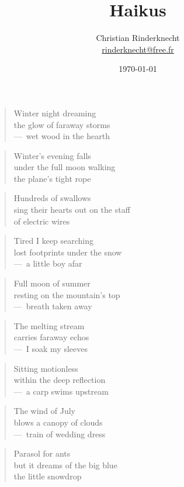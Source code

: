 \documentclass[a4paper,12pt]{article}
\title{Haikus}
\author{Christian Rinderknecht\\
{\small \url{rinderknecht@free.fr}}}
\date{\today}
\begin{document}
\begin{verse}
  Winter night dreaming \\
  the glow of faraway storms \\
  ---~wet wood in the hearth
\end{verse}

\begin{verse}
  Winter's evening falls \\
  under the full moon walking \\
  the plane's tight rope
\end{verse}

\begin{verse}
  Hundreds of swallows \\
  sing their hearts out on the staff \\
  of electric wires
\end{verse}

\begin{verse}
  Tired I keep searching \\
  lost footprints under the snow \\
  ---~a little boy afar
\end{verse}

\begin{verse}
  Full moon of summer \\
  resting on the mountain's top \\
  ---~breath taken away
\end{verse}

\begin{verse}
  The melting stream \\
  carries faraway echos \\
  ---~I soak my sleeves
\end{verse}

\begin{verse}
  Sitting motionless \\
  within the deep reflection \\
  ---~a carp swims upstream
\end{verse}

\begin{verse}
  The wind of July \\
  blows a canopy of clouds \\
  ---~train of wedding dress
\end{verse}

\begin{verse}
  Parasol for ants \\
  but it dreams of the big blue \\
  the little snowdrop
\end{verse}
\end{document}
